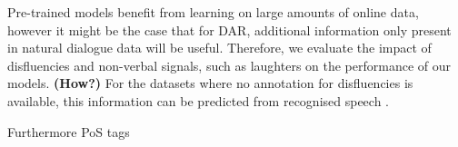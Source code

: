 \documentclass[11pt,a4paper,headings=standardclasses]{scrartcl}
\begin{document}
  Pre-trained models benefit from learning on large amounts of online data, however it might be the case that for DAR, additional information only present in natural dialogue data will be useful. Therefore, we evaluate the impact of disfluencies and non-verbal signals, such as laughters on the performance of our models. \textbf{(How?)} For the datasets where no annotation for disfluencies is available, this information can be predicted from recognised speech \citep{hough2017joint,shalyminov2018multi}.
  
  Furthermore PoS tags

{}

\end{document}
